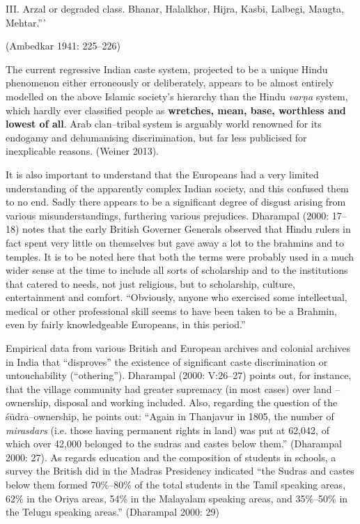 III. Arzal or degraded class. Bhanar, Halalkhor, Hijra, Kasbi, Lalbegi, Maugta, Mehtar.”’

\begin{flushright}
(Ambedkar 1941: 225–226)
\end{flushright}

The current regressive Indian caste system, projected to be a unique Hindu phenomenon either erroneously or deliberately, appears to be almost entirely modelled on the above Islamic society's hierarchy than the Hindu \textit{varṇa} system, which hardly ever classified people as \textbf{wretches, mean, base, worthless and lowest of all}. Arab clan–tribal system is arguably world renowned for its endogamy and dehumanising discrimination, but far less publicised for inexplicable reasons. (Weiner 2013).

It is also important to understand that the Europeans had a very limited understanding of the apparently complex Indian society, and this confused them to no end. Sadly there appears to be a significant degree of disgust arising from various misunderstandings, furthering various prejudices. Dharampal (2000: 17–18) notes that the early British Governer Generals observed that Hindu rulers in fact spent very little on themselves but gave away a lot to the brahmins and to temples. It is to be noted here that both the terms were probably used in a much wider sense at the time to include all sorts of scholarship and to the institutions that catered to needs, not just religious, but to scholarship, culture, entertainment and comfort. “Obviously, anyone who exercised some intellectual, medical or other professional skill seems to have been taken to be a Brahmin, even by fairly knowledgeable Europeans, in this period.”

Empirical data from various British and European archives and colonial archives in India that “disproves” the existence of significant caste discrimination or untouchability (“othering”). Dharampal (2000: V:26–27) points out, for instance, that the village community had greater supremacy (in most cases) over land – ownership, disposal and working included. Also, regarding the question of the śūdra–ownership, he points out: “Again in Thanjavur in 1805, the number of \textit{mirasdars} (i.e. those having permanent rights in land) was put at 62,042, of which over 42,000 belonged to the sudras and castes below them.” (Dharampal 2000: 27). As regards education and the composition of students in schools, a survey the British did in the Madras Presidency indicated “the Sudras and castes below them formed 70\%–80\% of the total students in the Tamil speaking areas, 62\% in the Oriya areas, 54\% in the Malayalam speaking areas, and 35\%–50\% in the Telugu speaking areas.” (Dharampal 2000: 29)

